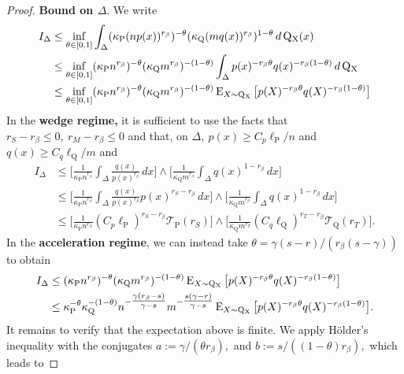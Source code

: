 \documentclass[10pt,a4paper]{amsart}
\newcommand{\E}{\operatorname{E}}
\renewcommand{\P}{\operatorname{P}}
\newcommand{\Q}{\operatorname{Q}}
\renewcommand{\k}{\kappa}
\newcommand{\mT}{\mathcal{T}}
\newcommand{\sX}{\mathrm{X}}
\begin{document}
\begin{proof}
    \noindent\textbf{Bound on $\Delta.$}
    We write
    \begin{align*}
        I_{\Delta} &\leq \inf_{\theta \in [0, 1]}\int_{\Delta}(\k_{\P}(np(x))^{r_\beta})^{-\theta}(\k_{\Q}(mq(x))^{r_\beta})^{1 - \theta}\, d\Q\mathstrut_{\!\sX}(x)\\
        &\leq \inf_{\theta \in [0, 1]}(\k_{\P}n^{r_\beta})^{-\theta}(\k_{\Q}m^{r_\beta})^{-(1 - \theta)}\int_{\Delta}p(x)^{-r_\beta \theta}q(x)^{-r_\beta(1 - \theta)}\, d\Q\mathstrut_{\!\sX}\\
        &\leq \inf_{\theta \in [0, 1]}(\k_{\P}n^{r_\beta})^{-\theta}(\k_{\Q}m^{r_\beta})^{-(1 - \theta)}\E_{X \sim \Q\mathstrut_{\!\sX}}\big[p(X)^{-r_\beta \theta}q(X)^{-r_\beta(1 - \theta)}\big]
    \end{align*}
    In the \textbf{wedge regime,} it is sufficient to use the facts that $r_S - r_\beta \leq 0, \ r_M - r_\beta \leq 0$ and that, on $\Delta, \ p(x) \geq C_p\ell_{\P}/n$ and $q(x) \geq C_q \ell_{\Q}/m$ and 
    \begin{align*}
        I_{\Delta} &\leq \bigg[\frac{1}{\k_{\P}n^{r_\beta}}\int_{\Delta}\frac{q(x)}{p(x)^{r_\beta}}\, dx\bigg]\wedge \bigg[\frac{1}{\k_{\Q}m^{r_\beta}}\int_{\Delta}q(x)^{1 - r_\beta}\, dx\bigg]\\
        &\leq \bigg[\frac{1}{\k_{\P}n^{r_\beta}}\int_{\Delta}\frac{q(x)}{p(x)^{r_S}}p(x)^{r_S - r_\beta}\, dx\bigg]\wedge \bigg[\frac{1}{\k_{\Q}m^{r_\beta}}\int_{\Delta}q(x)^{1 - r_\beta}\, dx\bigg]\\
        &\leq \bigg[\frac{1}{\k_{\P}n^{r_S}}(C_p\ell_{\P})^{r_S - r_\beta}\mT_{\P}(r_S)\bigg]\wedge\bigg[\frac{1}{\k_{\Q}m^{r_T}}(C_q\ell_{\Q})^{r_T - r_\beta}\mT_{\Q}(r_T)\bigg].
    \end{align*}
    In the \textbf{acceleration regime}, we can instead take $\theta = \gamma(s - r)/(r_\beta(s - \gamma))$ to obtain
    \begin{align*}
        I_{\Delta} &\leq (\k_{\P}n^{r_\beta})^{-\theta}(\k_{\Q}m^{r_\beta})^{-(1 - \theta)}\E_{X \sim \Q\mathstrut_{\!\sX}}\big[p(X)^{-r_\beta \theta}q(X)^{-r_\beta(1 - \theta)}\big]\\
        &\leq \k_{\P}^{-\theta}\k_{\Q}^{-(1 - \theta)}n^{-\tfrac{\gamma(r_\beta - s)}{\gamma - s}}m^{-\tfrac{s(\gamma - r)}{\gamma - s}}\E_{X \sim \Q\mathstrut_{\!\sX}}\big[p(X)^{-r_\beta \theta}q(X)^{-r_\beta(1 - \theta)}\big].
    \end{align*}
    It remains to verify that the expectation above is finite. We apply H\"older's inequality with the conjugates $a := \gamma/(\theta r_\beta),$ and $b := s/((1 - \theta)r_\beta),$ which leads to

\end{proof}
\end{document}
